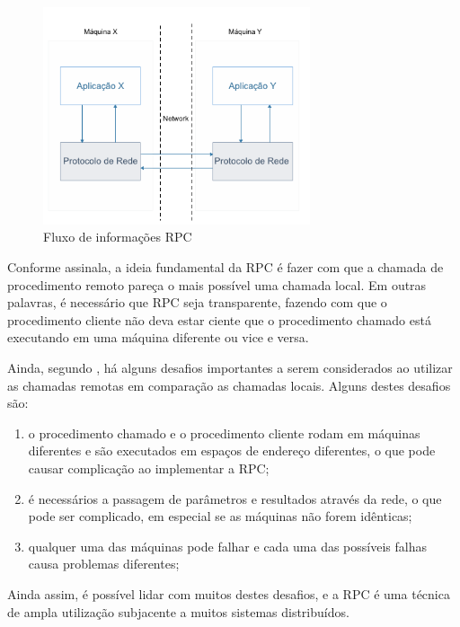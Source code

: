 \begin{figure}
    \centering
    \includegraphics[width=0.7\textwidth]{figuras/rpc.png}
    \caption{Fluxo de informações RPC}
    \label{fig:rpc}
\end{figure}

Conforme  assinala, a ideia fundamental da RPC é fazer com que a chamada de procedimento remoto pareça o mais possível uma chamada local. Em outras palavras, é necessário que RPC seja transparente, fazendo com que o procedimento cliente não deva estar ciente que o procedimento chamado está executando em uma máquina diferente ou vice e versa.

Ainda, segundo , há alguns desafios importantes a serem considerados ao utilizar as chamadas remotas em comparação as chamadas locais. Alguns destes desafios são:

\begin{enumerate}[label=\alph*)]
    \item o procedimento chamado e o procedimento cliente rodam em máquinas diferentes e são executados em espaços de endereço diferentes, o que pode causar complicação ao implementar a RPC; 

\item é necessários a passagem de parâmetros e resultados através da rede, o que pode ser complicado, em especial se as máquinas não forem idênticas;

\item qualquer uma das máquinas pode falhar e cada uma das possíveis falhas causa problemas diferentes;

\end{enumerate}

Ainda assim, é possível lidar com muitos destes desafios, e a RPC é uma técnica de ampla utilização subjacente a muitos sistemas distribuídos.

